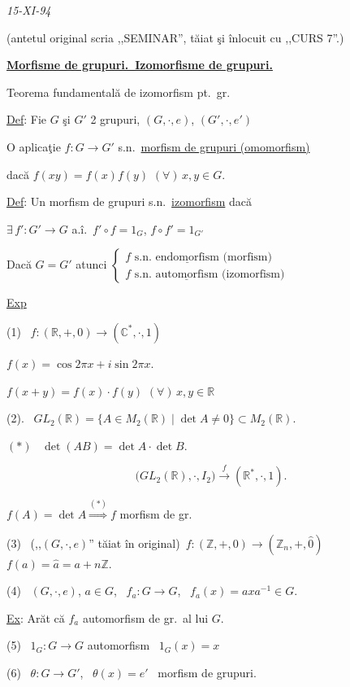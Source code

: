 \documentclass[12pt]{article}
\begin{document}
\begin{center}
\end{center}
\begin{flushright}
\textit{15-XI-94}
\end{flushright}
\noindent \footnotesize (antetul original scria ,,SEMINAR'', tăiat şi înlocuit cu ,,CURS 7''.)\normalsize

\bigskip
\noindent\underline{\textbf{Morfisme de grupuri.\ Izomorfisme de grupuri.}}

\noindent Teorema fundamentală de izomorfism pt.\ gr.

\bigskip
\noindent\underline{Def}: Fie $G$ şi $G'$ 2 grupuri, $(G,\cdot,e)$, $(G',\cdot,e')$

\noindent O aplicaţie $f:G\to G'$ s.n.\ \underline{morfism de grupuri (omomorfism)}

\noindent dacă $f(xy)=f(x)f(y)$ $(\forall)\,x,y\in G$.

\bigskip
\noindent\underline{Def}: Un morfism de grupuri s.n.\ \underline{izomorfism} dacă

\noindent $\exists\,f':G'\to G$ a.î.\ $f'\circ f=1_G$, $f\circ f'=1_{G'}$

\bigskip
\noindent Dacă $G=G'$ atunci $\begin{cases} f \text{ s.n.\ } \underline{\text{endomorfism}} \text{ (morfism)} \\ f \text{ s.n.\ } \underline{\text{automorfism}} \text{ (izomorfism)}\end{cases}$

\bigskip
\noindent\underline{Exp}

\noindent (1) \ $f:(\mathbb{R},+,0) \to (\mathbb{C}^*,\cdot,1)$

\noindent $f(x) = \cos 2\pi x + i\sin 2\pi x$.

\noindent $f(x+y) = f(x)\cdot f(y)$ $(\forall)\,x,y\in\mathbb{R}$

\bigskip
\noindent (2). \ $GL_2(\mathbb{R}) = \{A\in M_2(\mathbb{R}) \mid \det A\neq 0\} \subset M_2(\mathbb{R})$.

\noindent $(*)$ \ $\det(AB) = \det A\cdot \det B$.

\[
\big(GL_2(\mathbb{R}),\cdot,I_2\big) \xrightarrow{\ f\ } (\mathbb{R}^*,\cdot,1).
\]

\noindent $f(A) = \det A \overset{(*)}{\Longrightarrow} f$ morfism de gr.

\bigskip
\noindent (3) \ \footnotesize (,,$(G,\cdot,e)$'' tăiat în original)\normalsize \ $f:(\mathbb{Z},+,0) \to (\mathbb{Z}_n,+,\hat 0)$ \quad $f(a)=\hat a = a+n\mathbb{Z}$.

\bigskip
\noindent (4) \ $(G,\cdot,e)$, $a\in G$, \ $f_a:G\to G$, \ $f_a(x)=axa^{-1}\in G$.

\noindent\underline{Ex}: Arăt că $f_a$ automorfism de gr.\ al lui $G$.

\bigskip
\noindent (5) \ $1_G: G\to G$ automorfism \ $1_G(x)=x$

\bigskip
\noindent (6) \ $\theta:G\to G'$, \ $\theta(x)=e'$ \ morfism de grupuri.
\end{document}
